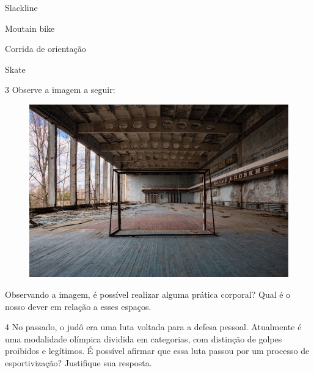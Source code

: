 \begin{boxlist}

 Slackline

 Moutain bike

 Corrida de orientação

 Skate
\end{boxlist}


\num{3} Observe a imagem a seguir:

\begin{figure}[htpb!]
\centering
\includegraphics[width=.65\textwidth]{./imgs/img1.jpg}
\end{figure}

\pagebreak

Observando a imagem, é possível realizar alguma prática corporal? Qual é
o nosso dever em relação a esses espaços.


\num{4} No passado, o judô era uma luta voltada para a defesa pessoal.
  Atualmente é uma modalidade olímpica dividida em categorias, com 
  distinção de golpes proibidos e legítimos. É possível afirmar que essa
  luta passou por um processo de esportivização? Justifique sua
  resposta.

